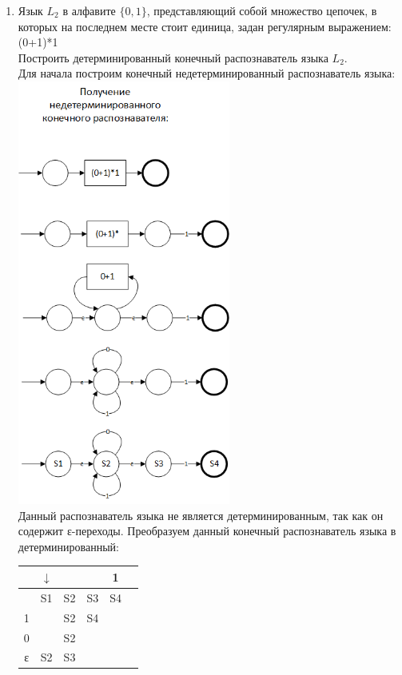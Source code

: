 \documentclass[a4paper,14pt]{extarticle}
\begin{document}
\begin{enumerate}[1.]
\item Язык $L_2$ в алфавите $\{0,1\}$, представляющий собой множество цепочек, в
которых на последнем месте стоит единица, задан регулярным выражением:\\
(0+1)*1\\
Построить детерминированный конечный распознаватель языка $L_2$.\\
Для начала построим конечный недетерминированный распознаватель языка:\\
\includegraphics[width=70mm]{task2_non_determined}\\
Данный распознаватель языка не является детерминированным, 
так как он содержит ε-переходы. 
Преобразуем данный конечный распознаватель языка в детерминированный:\\
\begin{tabular}{|c|c|c|c|c|c|}
	\hline
	   & $\downarrow$ &    &    & 1  \\
	\hline
	   & S1           & S2 & S3 & S4 \\
	\hline
	1  &              & S2 & S4 &    \\
	\hline
	0  &              & S2 &    &    \\
	\hline
	ε  & S2           & S3 &    &    \\
	\hline
\end{tabular}


\end{enumerate}
\end{document}
